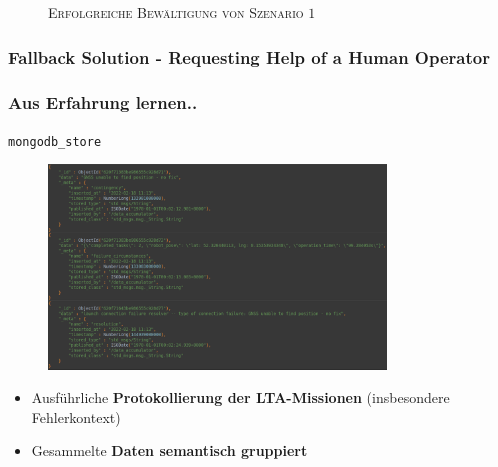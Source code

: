 \documentclass{beamer}
\newcommand{\code}[1]{\colorbox{light-gray}{\texttt{#1}}}
\begin{document}
\begin{frame}
\begin{figure}[H]
\begin{subfigure}[b]{0.24\textwidth}
    \end{subfigure}
  \caption*{\textsc{Erfolgreiche Bewältigung von Szenario $1$}}
  \end{figure}
\end{frame}

\begin{frame}
  \frametitle{Fallback Solution - Requesting Help of a Human Operator}
\end{frame}

\begin{frame}
  \frametitle{Aus Erfahrung lernen..}
  \code{mongodb\_store}
  \begin{figure}[H]
    \centering
    \includegraphics[width=0.8\textwidth]{img/database_entries.png}
  \end{figure}
  \begin{itemize}
    \item Ausführliche \textbf{Protokollierung der LTA-Missionen} (insbesondere Fehlerkontext)
    \item Gesammelte \textbf{Daten semantisch gruppiert}
  \end{itemize}
\end{frame}



\end{document}
